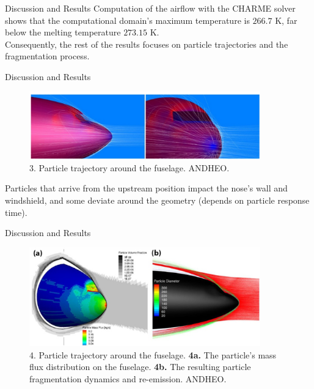 \documentclass[aspectratio=169,xcolor=dvipsnames]{beamer}
\begin{document}
\begin{frame}{Discussion and Results}
  Computation of the airflow with the CHARME solver shows that the computational domain's maximum temperature is $266.7$ K, far below the melting temperature $273.15$ K.\\ 
  \vspace{2pt}
  Consequently, the rest of the results focuses on particle trajectories and the fragmentation process. 
\end{frame}

\begin{frame}{Discussion and Results}
  \begin{figure}[h]
\includegraphics[width=10cm]{images/trajectory.png}
\caption{3. Particle trajectory around the fuselage. \textcopyright ANDHEO.}
\label{Fig2}
\end{figure}
Particles that arrive from the upstream position impact the nose's wall and windshield, and some deviate around the geometry (depends on particle response time).
\end{frame}

\begin{frame}{Discussion and Results}
  \begin{figure}[h]
\includegraphics[width=10cm]{images/trajectory2.png}
\caption{4. Particle trajectory around the fuselage. \textbf{4a.} The particle's mass flux distribution on the fuselage. \textbf{4b.} The resulting particle fragmentation dynamics and re-emission. \textcopyright ANDHEO.}
\label{Fig2}
\end{figure}

\end{frame}
\end{document}
